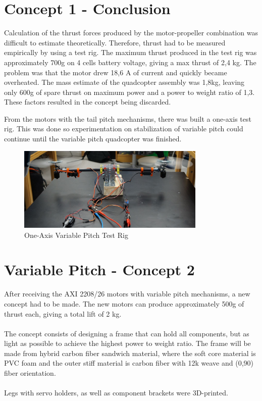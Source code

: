 \section{Concept 1 - Conclusion}
Calculation of the thrust forces produced by the motor-propeller combination was difficult to estimate theoretically. Therefore, thrust had to be measured empirically by using a test rig. The maximum thrust produced in the test rig was approximately 700g on 4 cells battery voltage, giving a max thrust of 2,4 kg. The problem was that the motor drew 18,6 A of current and quickly became overheated. The mass estimate of the quadcopter assembly was 1,8kg, leaving only 600g of spare thrust on maximum power and a power to weight ratio of 1,3. These factors resulted in the concept being discarded.\bigskip

From the motors with the tail pitch mechanisms, there was built a one-axis test rig. This was done so experimentation on stabilization of variable pitch could continue until the variable pitch quadcopter was finished. 

\begin{figure}[H]
    \centering
         \includegraphics[width = 0.8\textwidth]{VAPIQ-PICTURES/VPQ_rainbow_Rig.jpg}
      \caption{One-Axis Variable Pitch Test Rig}
\end{figure} 



\section{Variable Pitch - Concept 2}
\label{sec;VPQply}

After receiving the AXI 2208/26 motors with variable pitch mechanisms, a new concept had to be made. The new motors can produce approximately 500g of thrust each, giving a total lift of 2 kg.
\\\\
The concept consists of designing a frame that can hold all components, but as light as possible to achieve the highest power to weight ratio. The frame will be made from hybrid carbon fiber sandwich material, where the soft core material is PVC foam and the outer stiff material is carbon fiber with 12k weave and (0,90) fiber orientation.
\\\\
Legs with servo holders, as well as component brackets were 3D-printed.

